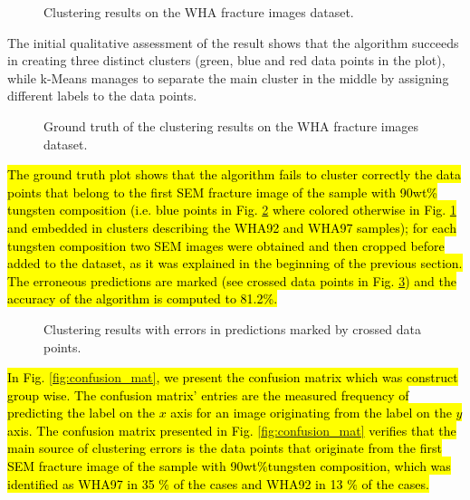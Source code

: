 \documentclass[authoryear,preprint,review,12pt, singleside]{elsarticle}
\begin{document}
\begin{figure}[!h]
	\centering
	\caption{Clustering results on the WHA fracture images dataset.}
	\label{fig:cluster_result}
\end{figure}

The initial qualitative assessment of the result shows that the algorithm succeeds in creating three distinct clusters (green, blue and red data points in the plot), while k-Means manages to separate the main cluster in the middle by assigning different labels to the data points.  

\begin{figure}[!h]
	\centering
	\caption{Ground truth of the clustering results on the WHA fracture images dataset.}
	\label{fig:cluster_result_gt}
\end{figure}

\hl{The ground truth plot shows that the algorithm fails to cluster correctly the data points that belong to the first SEM fracture image of the sample with 90wt\% tungsten composition (i.e. blue points in Fig.  \ref{fig:cluster_result_gt} where colored otherwise in Fig.  \ref{fig:cluster_result} and embedded in clusters describing the WHA92 and WHA97 samples); for each tungsten composition  two SEM images were obtained and then cropped before added to the dataset, as it was explained in the beginning of the previous section. The erroneous predictions are marked (see crossed data points in Fig. \ref{fig:cluster_result_errors}) and the accuracy of the algorithm is computed to 81.2\%.}


\begin{figure}[!h]
	\centering
	\caption{Clustering results with errors in predictions marked by crossed data points.}
	\label{fig:cluster_result_errors}
\end{figure}

\hl{In Fig. \ref{fig:confusion_mat}, we present the confusion matrix which was construct group wise. The confusion matrix' entries are the measured  frequency of predicting the label on the $x$ axis for an image originating from the label on the $y$ axis. The confusion matrix presented in Fig. \ref{fig:confusion_mat} verifies that the main source of clustering errors is the data points that originate from the first SEM fracture image of the  sample with 90wt$\% $tungsten composition, which was identified as WHA97 in 35 $\%$ of the cases and WHA92 in 13 $\%$ of the cases. }
\end{document}
